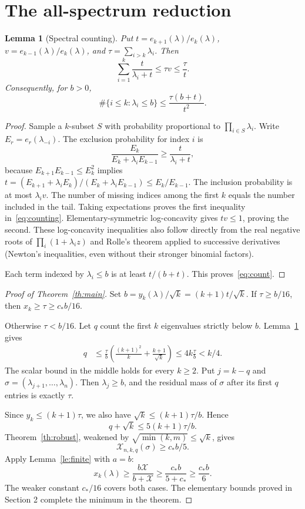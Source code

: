 \documentclass[11pt]{article}
\newtheorem{lemma}[theorem]{Lemma}
\theoremstyle{remark}\newtheorem{remark}[theorem]{Remark}
\newcommand{\X}{\mathcal X}
\newcommand{\cstar}{c_*}
\begin{document}
\section{The all-spectrum reduction}\label{sec:reduction}
\begin{lemma}[Spectral counting]\label{le:counting}
Put $t=e_{k+1}(\lambda)/e_k(\lambda)$, $v=e_{k-1}(\lambda)/e_k(\lambda)$, and $\tau=\sum_{i>k}\lambda_i$. Then
\begin{equation}\label{eq:counting}
 \sum_{i=1}^k\frac{t}{\lambda_i+t}
 \le\tau v\le\frac{\tau}{t}.
\end{equation}
Consequently, for $b>0$,
\begin{equation}\label{eq:count}
 \#\{i\le k:\lambda_i\le b\}
 \le\frac{\tau(b+t)}{t^2}.
\end{equation}
\end{lemma}
\begin{proof}
Sample a $k$-subset $S$ with probability proportional to $\prod_{i\in S}\lambda_i$. Write $E_r=e_r(\lambda_{-i})$. The exclusion probability for index $i$ is
\[
 \frac{E_k}{E_k+\lambda_i E_{k-1}}\ge\frac{t}{\lambda_i+t},
\]
because $E_{k+1}E_{k-1}\le E_k^2$ implies
$t=(E_{k+1}+\lambda_i E_k)/(E_k+\lambda_i E_{k-1})\le E_k/E_{k-1}$. The inclusion probability is at most $\lambda_i v$. The number of missing indices among the first $k$ equals the number included in the tail. Taking expectations proves the first inequality in~\eqref{eq:counting}. Elementary-symmetric log-concavity gives $tv\le1$, proving the second. These log-concavity inequalities also follow directly from the real negative roots of $\prod_i(1+\lambda_i z)$ and Rolle's theorem applied to successive derivatives (Newton's inequalities, even without their stronger binomial factors).

Each term indexed by $\lambda_i\le b$ is at least $t/(b+t)$. This proves~\eqref{eq:count}.
\end{proof}

\begin{proof}[Proof of Theorem~\ref{th:main}]
Set $b=y_k(\lambda)/\sqrt k=(k+1)t/\sqrt k$. If $\tau\ge b/16$, then $x_k\ge\tau\ge \cstar b/16$.

Otherwise $\tau<b/16$. Let $q$ count the first $k$ eigenvalues strictly below $b$. Lemma~\ref{le:counting} gives
\begin{align*}
 q&\le\frac{\tau}{b}
 \left(\frac{(k+1)^2}{k}+\frac{k+1}{\sqrt k}\right)
 \le4k\frac{\tau}{b}<k/4.
\end{align*}
The scalar bound in the middle holds for every $k\ge2$. Put $j=k-q$ and $\sigma=(\lambda_{j+1},\ldots,\lambda_n)$. Then $\lambda_j\ge b$, and the residual mass of $\sigma$ after its first $q$ entries is exactly $\tau$.

Since $y_k\le(k+1)\tau$, we also have $\sqrt k\le(k+1)\tau/b$. Hence
\[
 q+\sqrt k\le5(k+1)\tau/b.
\]
Theorem~\ref{th:robust}, weakened by $\sqrt{\min(k,m)}\le\sqrt k$, gives
\[
 \X_{n,k,q}(\sigma)\ge\cstar b/5.
\]
Apply Lemma~\ref{le:finite} with $a=b$:
\[
 x_k(\lambda)\ge\frac{b\X}{b+\X}
 \ge\frac{\cstar b}{5+\cstar}\ge\frac{\cstar b}{6}.
\]
The weaker constant $\cstar/16$ covers both cases. The elementary bounds proved in Section 2 complete the minimum in the theorem.
\end{proof}
\end{document}

